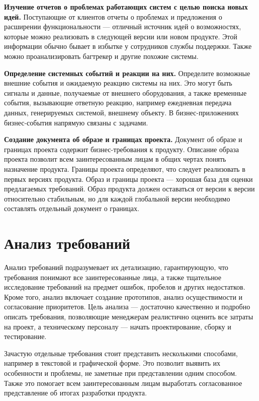 \documentclass{../../text-style}
\begin{document}
\textbf{Изучение отчетов о проблемах работающих систем с целью поиска новых идей.} Поступающие от клиентов отчеты о проблемах и предложения о расширении функциональности --- отличный источник идей о возможностях, которые можно реализовать в следующей версии или новом продукте. Этой информации обычно бывает в избытке у сотрудников службы поддержки. Также можно проанализировать багтрекер и другие похожие системы.

\textbf{Определение системных событий и реакции на них.} Определите возможные внешние события и ожидаемую реакцию системы на них. Это могут быть сигналы и данные, получаемые от внешнего оборудования, а также временные события, вызывающие ответную реакцию, например ежедневная передача данных, генерируемых системой, внешнему объекту. В бизнес-приложениях бизнес-события напрямую связаны с задачами.

\textbf{Создание документа об образе и границах проекта.} Документ об образе и границах проекта содержит бизнес-требования к продукту. Описание образа проекта позволит всем заинтересованным лицам в общих чертах понять назначение продукта. Границы проекта определяют, что следует реализовать в первых версиях продукта. Образ и границы проекта --- хорошая база для оценки предлагаемых требований. Образ продукта должен оставаться от версии к версии относительно стабильным, но для каждой глобальной версии необходимо составлять отдельный документ о границах.

\section{Анализ требований}

Анализ требований подразумевает их детализацию, гарантирующую, что требования понимают все заинтересованные лица, а также тщательное исследование требований на предмет ошибок, пробелов и других недостатков. Кроме того, анализ включает создание прототипов, анализ осуществимости и согласование приоритетов. Цель анализа --- достаточно качественно и подробно описать требования, позволяющие менеджерам реалистично оценить все затраты на проект, а техническому персоналу --- начать проектирование, сборку и тестирование.

Зачастую отдельные требования стоит представить несколькими способами, например в текстовой и графической форме. Это позволит выявить их особенности и проблемы, не заметные при представлении одним способом. Также это помогает всем заинтересованным лицам выработать согласованное представление об итогах разработки продукта. 
\end{document}
